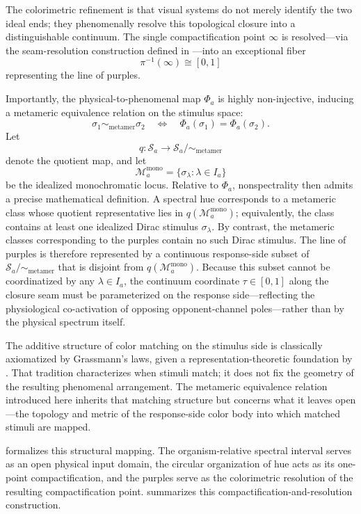 \documentclass[preprint,12pt,authoryear]{elsarticle}
\theoremstyle{plain}
\theoremstyle{definition}
\theoremstyle{remark}
\begin{document}
The colorimetric refinement is that visual systems do not merely identify the two ideal ends; they phenomenally resolve this topological closure into a distinguishable continuum. The single compactification point $\infty$ is resolved---via the seam-resolution construction defined in ---into an exceptional fiber
$$
\pi^{-1}(\infty)\cong[0,1]
$$
representing the line of purples.

Importantly, the physical-to-phenomenal map $\Phi_a$ is highly non-injective, inducing a metameric equivalence relation on the stimulus space:
\[
  \sigma_1 \sim_{\mathrm{metamer}} \sigma_2
  \quad \Longleftrightarrow \quad
  \Phi_a(\sigma_1)=\Phi_a(\sigma_2).
\]
Let
\[
  q:\mathcal S_a \longrightarrow \mathcal S_a/{\sim_{\mathrm{metamer}}}
\]
denote the quotient map, and let
\[
  \mathcal M_a^{\mathrm{mono}}
  =
  \{\sigma_\lambda:\lambda\in I_a\}
\]
be the idealized monochromatic locus. Relative to $\Phi_a$, nonspectrality then admits a precise mathematical definition. A spectral hue corresponds to a metameric class whose quotient representative lies in $q(\mathcal M_a^{\mathrm{mono}})$; equivalently, the class contains at least one idealized Dirac stimulus $\sigma_\lambda$. By contrast, the metameric classes corresponding to the purples contain no such Dirac stimulus. The line of purples is therefore represented by a continuous response-side subset of $\mathcal S_a/{\sim_{\mathrm{metamer}}}$ that is disjoint from $q(\mathcal M_a^{\mathrm{mono}})$. Because this subset cannot be coordinatized by any $\lambda\in I_a$, the continuum coordinate $\tau\in[0,1]$ along the closure seam must be parameterized on the response side---reflecting the physiological co-activation of opposing opponent-channel poles---rather than by the physical spectrum itself.

The additive structure of color matching on the stimulus side is classically axiomatized by Grassmann's laws, given a representation-theoretic foundation by \citet{Krantz1975}. That tradition characterizes when stimuli match; it does not fix the geometry of the resulting phenomenal arrangement. The metameric equivalence relation introduced here inherits that matching structure but concerns what it leaves open---the topology and metric of the response-side color body into which matched stimuli are mapped.

 formalizes this structural mapping. The organism-relative spectral interval serves as an open physical input domain, the circular organization of hue acts as its one-point compactification, and the purples serve as the colorimetric resolution of the resulting compactification point.  summarizes this compactification-and-resolution construction.
\end{document}
